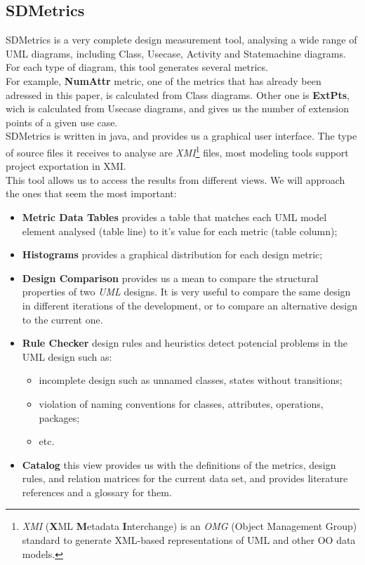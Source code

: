 \subsection{SDMetrics}
SDMetrics is a very complete design measurement tool, analysing a wide range of UML diagrams, including Class, Usecase, Activity and Statemachine diagrams.
For each type of diagram, this tool generates several metrics.\\
For example, \textbf{NumAttr} metric, one of the metrics that has already been adressed in this paper, is calculated from Class diagrams.
Other one is \textbf{ExtPts}, wich is calculated from Usecase diagrams, and gives us the number of extension points of a given use case.\\

SDMetrics is written in java, and provides us a graphical user interface. The type of source files it receives to analyse are \textit{XMI}\footnote{
\textit{XMI} (\textbf{X}ML \textbf{M}etadata \textbf{I}nterchange)  is an \textit{OMG} (Object Management Group) standard to generate
XML-based representations of UML and other OO data models.} files, most modeling tools support project exportation in XMI.\\
This tool allows us to access the results from different views. We will approach the ones that seem the most important:
\begin{itemize}
\item \textbf{Metric Data Tables} provides a table that matches each UML model element analysed (table line) to it's value for each metric (table column);
\item \textbf{Histograms} provides a graphical distribution  for each design metric;
\item \textbf{Design Comparison} provides us a mean to compare the structural properties of two \textit{UML} designs. It is very useful to compare the same design in different iterations of the development, or to compare an alternative design to the current one.
\item \textbf{Rule Checker} design rules and heuristics detect potencial problems in the UML design such as: 
	\begin{itemize}
	\item incomplete design such as unnamed classes, states without transitions;
	\item violation of naming conventions for classes, attributes, operations, packages;
	\item etc.
	\end{itemize}
\item \textbf{Catalog} this view provides us with the definitions of the metrics, design rules, and relation matrices for the current data set, and provides literature references and a glossary for them.
\end{itemize}
